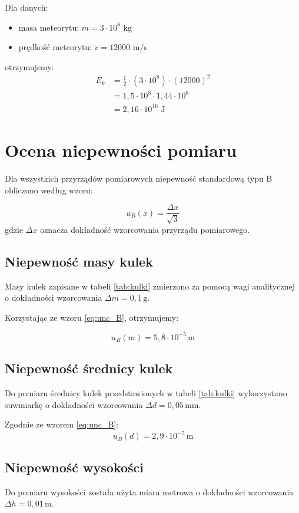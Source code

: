 \documentclass[a4paper,12pt]{article}
\begin{document}
Dla danych:
\begin{itemize}
    \item masa meteorytu: \( m = 3 \cdot 10^8 \) kg
    \item prędkość meteorytu: \( v = 12000 \) m/s
\end{itemize}

otrzymujemy:
\begin{align*}
E_k &= \frac{1}{2} \cdot (3 \cdot 10^8) \cdot (12000)^2 \\
&= 1,5 \cdot 10^8 \cdot 1,44 \cdot 10^8 \\
&= 2,16 \cdot 10^{16} \text{ J}
\end{align*}

\section{Ocena niepewności pomiaru}

Dla wszystkich przyrządów pomiarowych niepewność standardową typu B obliczono według wzoru:

\begin{equation}
    \label{eq:unc_B}
    u_B(x) = \frac{\Delta x}{\sqrt{3}}
\end{equation}
gdzie $\Delta x$ oznacza dokładność wzorcowania przyrządu pomiarowego.

\subsection{Niepewność masy kulek}
Masy kulek zapisane w tabeli \ref{tab:kulki} zmierzono za pomocą wagi analitycznej o dokładności wzorcowania $\Delta m = 0,1 \, \text{g}$. 

Korzystając ze wzoru \eqref{eq:unc_B}, otrzymujemy:

$$
u_B(m) = 5,8 \cdot 10^{-5} \, \text{m}
$$

\subsection{Niepewność średnicy kulek}
Do pomiaru średnicy kulek przedstawionych w tabeli \ref{tab:kulki} wykorzystano suwmiarkę o dokładności wzorcowania $\Delta d = 0,05 \, \text{mm}$. 

Zgodnie ze wzorem \eqref{eq:unc_B}:
\[
u_B(d) = 2,9 \cdot 10^{-5} \, \text{m}
\]

\subsection{Niepewność wysokości}
Do pomiaru wysokości została użyta miara metrowa o dokładności wzorcowania $\Delta h = 0,01 \, \text{m}$. 
\end{document}
